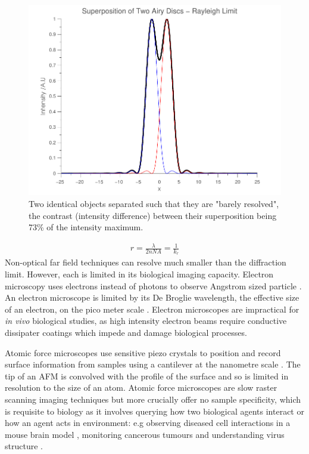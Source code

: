 \begin{figure}
	\centering
	\includegraphics[width=0.7\linewidth]{rayleighlimit}
	\caption[Rayleigh Limit]{Two identical objects separated such that they are "barely resolved", the contrast (intensity difference) between their superposition being 73\% of the intensity maximum. }
	\label{fig:rayleighlimit}
\end{figure}
\begin{align}
r = \frac{\lambda}{2nNA}=\frac{1}{k_r}\label{eq:rayleigh}
\end{align}
Non-optical far field techniques can resolve much smaller than the diffraction limit.  %
However, each is limited in its biological imaging capacity. %
Electron microscopy uses electrons instead of photons to observe Angstrom sized particle \cite{Ruska1941}. An electron microscope is limited by its De Broglie wavelength, the effective size of an electron, on the pico meter scale \cite{Ahmed2011,Bradbury1998}. Electron microscopes are impractical for \textit{in vivo} biological studies, as high intensity electron beams require conductive dissipater coatings which impede and damage biological processes.

Atomic force microscopes use sensitive piezo crystals to position and record surface information from samples using a cantilever at the nanometre scale \cite{Binnig1988}. The tip of an AFM is convolved with the profile of the surface and so is limited in resolution to the size of an atom. Atomic force microscopes are slow raster scanning imaging techniques but more crucially offer no sample specificity, which is requisite to biology as it involves querying how two biological agents interact or how an agent acts in environment: e.g  observing diseased cell interactions in a mouse brain model \cite{Misgeld2006}, monitoring cancerous tumours \cite{Hoffman2005} and understanding virus structure \cite{Pereira2012}.

